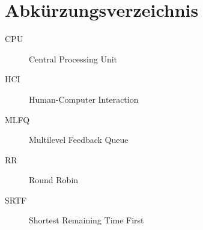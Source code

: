 \chapter*{Abkürzungsverzeichnis}

\begin{description}
  \item[CPU] Central Processing Unit
  \item[HCI] Human-Computer Interaction
  \item[MLFQ] Multilevel Feedback Queue
  \item[RR] Round Robin
  \item[SRTF] Shortest Remaining Time First
\end{description}
